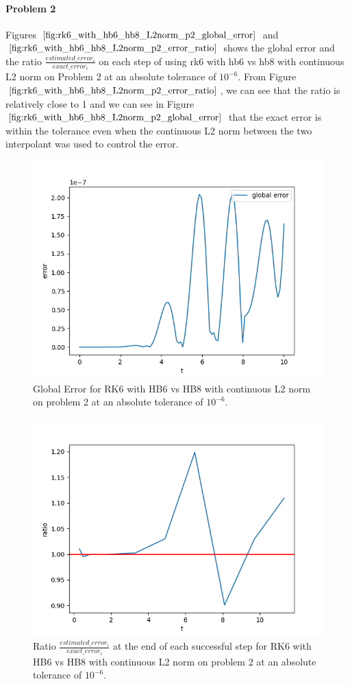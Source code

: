 \paragraph{Problem 2} Figures $\ref{fig:rk6_with_hb6_hb8_L2norm_p2_global_error}$ and $\ref{fig:rk6_with_hb6_hb8_L2norm_p2_error_ratio}$ shows the global error and the ratio $\frac{estimated\_error_i}{exact\_error_i}$ on each step of using rk6 with hb6 vs hb8 with continuous L2 norm on Problem 2 at an absolute tolerance of $10^{-6}$. From Figure $\ref{fig:rk6_with_hb6_hb8_L2norm_p2_error_ratio}$, we can see that the ratio is relatively close to 1 and we can see in Figure $\ref{fig:rk6_with_hb6_hb8_L2norm_p2_global_error}$ that the exact error is within the tolerance even when the continuous L2 norm between the two interpolant was used to control the error.

\begin{figure}[H]
\centering
\includegraphics[width=0.7\linewidth]{./figures/rk6_with_hb6_hb8_L2norm_p2_global_error}
\caption{Global Error for RK6 with HB6 vs HB8 with continuous L2 norm on problem 2 at an absolute tolerance of $10^{-6}$.}
\label{fig:rk6_with_hb6_hb8_L2norm_p2_global_error}
\end{figure}

\begin{figure}[H]
\centering
\includegraphics[width=0.7\linewidth]{./figures/rk6_with_hb6_hb8_L2norm_p2_error_ratio}
\caption{Ratio $\frac{estimated\_error_i}{exact\_error_i}$ at the end of each successful step for RK6 with HB6 vs HB8 with continuous L2 norm on problem 2 at an absolute tolerance of $10^{-6}$.}
\label{fig:rk6_with_hb6_hb8_L2norm_p2_error_ratio}
\end{figure}

